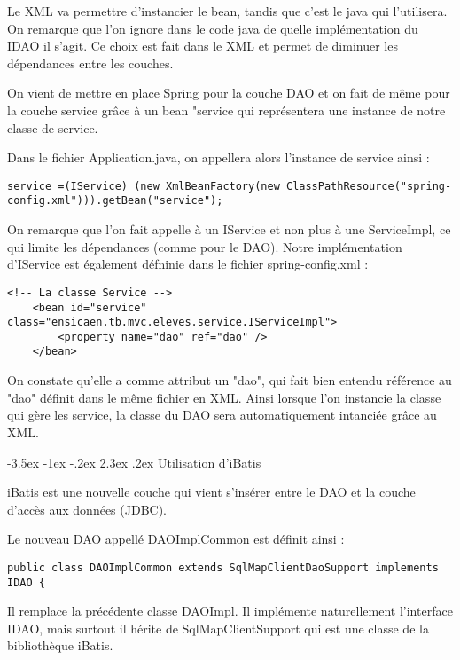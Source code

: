 \documentclass[a4paper,12pt]{article}
\makeatletter
\renewcommand\section{\@startsection {section}{1}{\z@}%
                           {-3.5ex \@plus -1ex \@minus -.2ex}%
                           {2.3ex \@plus.2ex}%
                           {\normalfont\Large\bfseries}}
\makeatother
\begin{document}
Le XML va permettre d'instancier le bean, tandis que c'est le java qui l'utilisera.
On remarque que l'on ignore dans le code java de quelle implémentation du IDAO il s'agit. Ce choix est fait dans le XML et permet de diminuer les dépendances entre les couches.

On vient de mettre en place Spring pour la couche DAO et on fait de même pour la couche service grâce à un bean "service qui représentera une instance de notre classe de service.

Dans le fichier Application.java, on appellera alors l'instance de service ainsi : 

\begin{lstlisting}
service =(IService) (new XmlBeanFactory(new ClassPathResource("spring-config.xml"))).getBean("service");
\end{lstlisting}

On remarque que l'on fait appelle à un IService et non plus à une ServiceImpl, ce qui limite les dépendances (comme pour le DAO).
Notre implémentation d'IService est également défninie dans le fichier spring-config.xml :

\begin{lstlisting}
<!-- La classe Service -->
	<bean id="service" class="ensicaen.tb.mvc.eleves.service.IServiceImpl">
		<property name="dao" ref="dao" />
	</bean>
\end{lstlisting}

On constate qu'elle a comme attribut un "dao", qui fait bien entendu référence au "dao" définit dans le même fichier en XML. Ainsi lorsque l'on
instancie la classe qui gère les service, la classe du DAO sera automatiquement intanciée grâce au XML.

\section{Utilisation d'iBatis}

iBatis est une nouvelle couche qui vient s'insérer entre le DAO et la couche d'accès aux données (JDBC).

Le nouveau DAO appellé DAOImplCommon est définit ainsi :

\begin{lstlisting}
public class DAOImplCommon extends SqlMapClientDaoSupport implements IDAO {
\end{lstlisting}
Il remplace la précédente classe DAOImpl.
Il implémente naturellement l'interface IDAO, mais surtout il hérite de SqlMapClientSupport qui est une classe de la bibliothèque iBatis.
\end{document}

